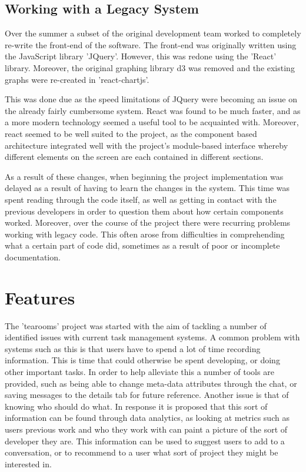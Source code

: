 \documentclass{l4proj}
\begin{document}
\section{Working with a Legacy System}

Over the summer a subset of the original development team worked to completely re-write the front-end of the software.  The front-end was originally written using the JavaScript library 'JQuery'.  However, this was redone using the 'React' library.  Moreover, the original graphing library d3 was removed and the existing graphs were re-created in 'react-chartjs'.

This was done due as the speed limitations of JQuery were becoming an issue on the already fairly cumbersome system.  React was found to be much faster, and as a more modern technology seemed a useful tool to be acquainted with.  Moreover, react seemed to be well suited to the project, as the component based architecture integrated well with the project's module-based interface whereby different elements on the screen are each contained in different sections.

As a result of these changes, when beginning the project implementation was delayed as a result of having to learn the changes in the system.  This time was spent reading through the code itself, as well as getting in contact with the previous developers in order to question them about how certain components worked.  Moreover, over the course of the project there were recurring problems working with legacy code.  This often arose from difficulties in comprehending what a certain part of code did, sometimes as a result of poor or incomplete documentation.

\chapter{Features}

The 'tearooms' project was started with the aim of tackling a number of identified issues with current task management systems. A common problem with systems such as this is that users have to spend a lot of time recording information.  This is time that could otherwise be spent developing, or doing other important tasks.  In order to help alleviate this a number of tools are provided, such as being able to change meta-data attributes through the chat, or saving messages to the details tab for future reference.   Another issue is that of knowing who should do what.  In response it is proposed that this sort of information can be found through data analytics, as looking at metrics such as users previous work and who they work with can paint a picture of the sort of developer they are.  This information can be used to suggest users to add to a conversation, or to recommend to a user what sort of project they might be interested in.
\end{document}
